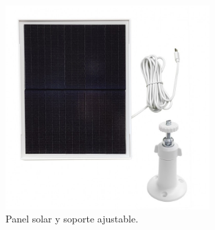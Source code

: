 \begin{figure}[h]
    \centering
    \includegraphics[width=0.7\textwidth]{img/herramientas/panel_solar.png}
    \caption{Panel solar y soporte ajustable.} \label{Img:PanelSolar}
\end{figure}

